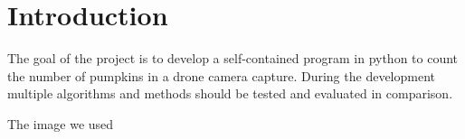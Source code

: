 \documentclass[../Head/Main.tex]{subfiles}
\begin{document}
\section{Introduction}

The goal of the project is to develop a self-contained program in python to count the number of pumpkins in a drone camera capture.
During the development multiple algorithms and methods should be tested and evaluated in comparison.

The image we used

\end{document}
